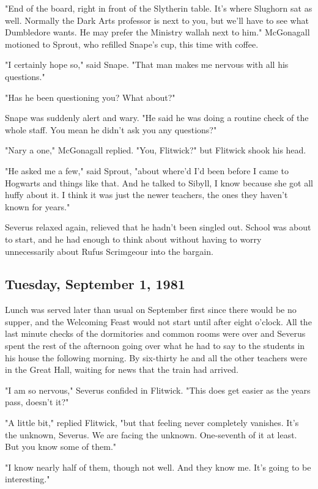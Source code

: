 "End of the board, right in front of the Slytherin table. It's where Slughorn sat as well. Normally the Dark Arts professor is next to you, but we'll have to see what Dumbledore wants. He may prefer the Ministry wallah next to him." McGonagall motioned to Sprout, who refilled Snape's cup, this time with coffee.

"I certainly hope so," said Snape. "That man makes me nervous with all his questions."

"Has he been questioning you? What about?"

Snape was suddenly alert and wary. "He said he was doing a routine check of the whole staff. You mean he didn't ask you any questions?"

"Nary a one," McGonagall replied. "You, Flitwick?" but Flitwick shook his head.

"He asked me a few," said Sprout, "about where'd I'd been before I came to Hogwarts and things like that. And he talked to Sibyll, I know because she got all huffy about it. I think it was just the newer teachers, the ones they haven't known for years."

Severus relaxed again, relieved that he hadn't been singled out. School was about to start, and he had enough to think about without having to worry unnecessarily about Rufus Scrimgeour into the bargain.

\subsection{Tuesday, September 1, 1981}

Lunch was served later than usual on September first since there would be no supper, and the Welcoming Feast would not start until after eight o'clock. All the last minute checks of the dormitories and common rooms were over and Severus spent the rest of the afternoon going over what he had to say to the students in his house the following morning. By six-thirty he and all the other teachers were in the Great Hall, waiting for news that the train had arrived.

"I am so nervous," Severus confided in Flitwick. "This does get easier as the years pass, doesn't it?"

"A little bit," replied Flitwick, "but that feeling never completely vanishes. It's the unknown, Severus. We are facing the unknown. One-seventh of it at least. But you know some of them."

"I know nearly half of them, though not well. And they know me. It's going to be interesting."

